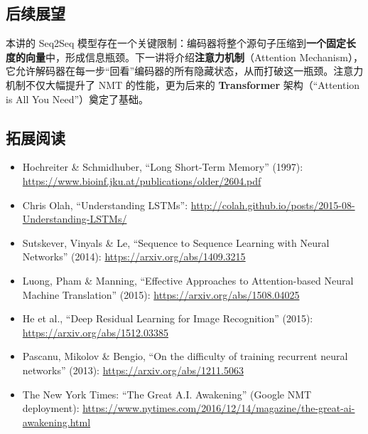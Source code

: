 \documentclass[a4paper]{article}
\begin{document}
\subsection{后续展望}

本讲的 Seq2Seq 模型存在一个关键限制：编码器将整个源句子压缩到\textbf{一个固定长度的向量}中，形成信息瓶颈。下一讲将介绍\textbf{注意力机制}（Attention Mechanism），它允许解码器在每一步``回看''编码器的所有隐藏状态，从而打破这一瓶颈。注意力机制不仅大幅提升了 NMT 的性能，更为后来的 \textbf{Transformer} 架构（``Attention is All You Need''）奠定了基础。

\subsection{拓展阅读}

\begin{itemize}
    \item Hochreiter \& Schmidhuber, ``Long Short-Term Memory'' (1997): \url{https://www.bioinf.jku.at/publications/older/2604.pdf}
    \item Chris Olah, ``Understanding LSTMs'': \url{http://colah.github.io/posts/2015-08-Understanding-LSTMs/}
    \item Sutskever, Vinyals \& Le, ``Sequence to Sequence Learning with Neural Networks'' (2014): \url{https://arxiv.org/abs/1409.3215}
    \item Luong, Pham \& Manning, ``Effective Approaches to Attention-based Neural Machine Translation'' (2015): \url{https://arxiv.org/abs/1508.04025}
    \item He et al., ``Deep Residual Learning for Image Recognition'' (2015): \url{https://arxiv.org/abs/1512.03385}
    \item Pascanu, Mikolov \& Bengio, ``On the difficulty of training recurrent neural networks'' (2013): \url{https://arxiv.org/abs/1211.5063}
    \item The New York Times: ``The Great A.I. Awakening'' (Google NMT deployment): \url{https://www.nytimes.com/2016/12/14/magazine/the-great-ai-awakening.html}
\end{itemize}
\end{document}
